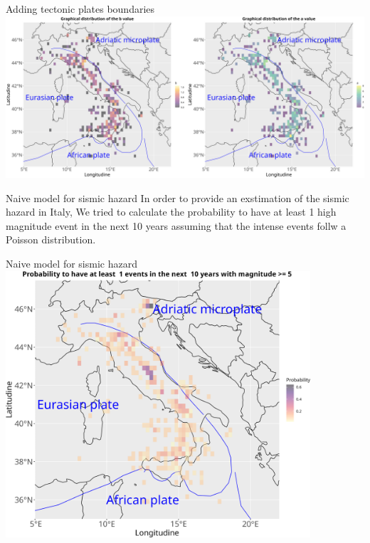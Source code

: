 \documentclass[aspectratio=43]{beamer}
\begin{document}
\begin{frame}{Adding tectonic plates boundaries}
	\centering
	\includegraphics[width=1\textwidth]{EQ_images/G_R_parameters_plates.png} \\
\end{frame}

\begin{frame}{Naive model for sismic hazard}
	\centering
	In order to provide an exstimation of the sismic hazard in Italy, We tried to calculate the probability to have at least 1 high magnitude event in the next 10 years assuming that the intense events follw a Poisson distribution.  
\end{frame}

\begin{frame}{Naive model for sismic hazard}
	\centering
	\includegraphics[width=0.85\textwidth]{EQ_images/probability.png} \\
\end{frame}
\end{document}
